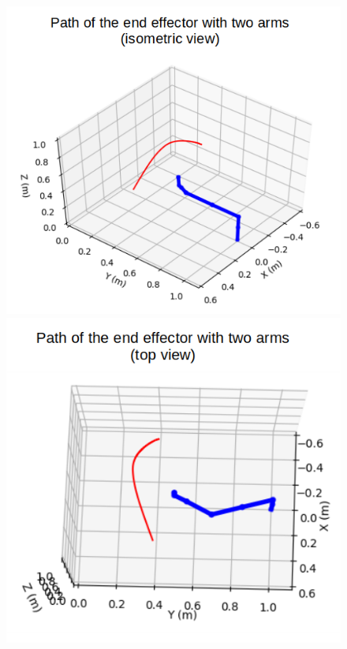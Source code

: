 \documentclass[a4paper, 11.5pt, conference]{ieeeconf}      %
\begin{document}
\begin{figure}[H]
	\centering
	\includegraphics[scale=0.25]{images/two_arms.png}
	\includegraphics[scale=0.25]{images/two_arms_top.png}

\end{figure}
\end{document}
